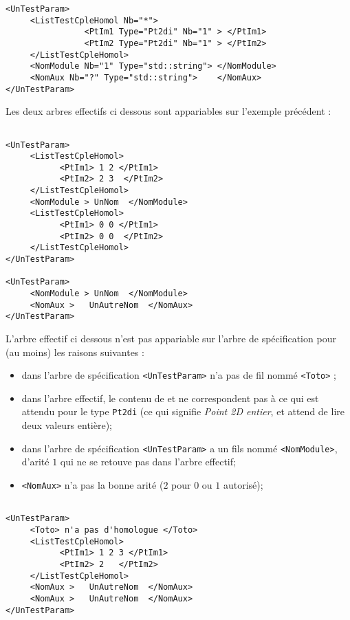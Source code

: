 \begin{verbatim}
<UnTestParam>
     <ListTestCpleHomol Nb="*">
                <PtIm1 Type="Pt2di" Nb="1" > </PtIm1>
                <PtIm2 Type="Pt2di" Nb="1" > </PtIm2>
     </ListTestCpleHomol>
     <NomModule Nb="1" Type="std::string"> </NomModule>
     <NomAux Nb="?" Type="std::string">    </NomAux>
</UnTestParam>
\end{verbatim}



Les deux arbres effectifs ci dessous sont appariables sur l'exemple
pr\'ec\'edent :

\begin{verbatim}

<UnTestParam>
     <ListTestCpleHomol>
           <PtIm1> 1 2 </PtIm1>
           <PtIm2> 2 3  </PtIm2>
     </ListTestCpleHomol>
     <NomModule > UnNom  </NomModule>
     <ListTestCpleHomol>
           <PtIm1> 0 0 </PtIm1>
           <PtIm2> 0 0  </PtIm2>
     </ListTestCpleHomol>
</UnTestParam>

<UnTestParam>
     <NomModule > UnNom  </NomModule>
     <NomAux >   UnAutreNom  </NomAux>
</UnTestParam>

\end{verbatim}

 

L'arbre effectif ci dessous n'est pas  appariable
sur l'arbre de sp\'ecification pour (au moins) les
raisons suivantes :

\begin{itemize}
   \item dans l'arbre de sp\'ecification {\tt <UnTestParam>} 
         n'a pas de fil nomm\'e {\tt  <Toto>} ;
   \item dans l'arbre effectif, le contenu de {\tt <PtIm1>} et
         {\tt <PtIm2>}  ne correspondent pas \`a ce qui est attendu pour
         le type {\tt Pt2di} (ce qui signifie \emph{Point 2D entier},
         et attend de lire deux valeurs enti\`ere);
    \item dans l'arbre de sp\'ecification {\tt <UnTestParam>}
          a un fils nomm\'e  {\tt  <NomModule>}, d'arit\'e $1$ qui
          ne se retouve pas dans l'arbre effectif;
    \item  {\tt <NomAux>} n'a pas la bonne arit\'e ($2$ pour 
           $0$ ou $1$ autoris\'e);
\end{itemize}

\begin{verbatim}

<UnTestParam>
     <Toto> n'a pas d'homologue </Toto>
     <ListTestCpleHomol>
           <PtIm1> 1 2 3 </PtIm1>
           <PtIm2> 2   </PtIm2>
     </ListTestCpleHomol>
     <NomAux >   UnAutreNom  </NomAux>
     <NomAux >   UnAutreNom  </NomAux>
</UnTestParam>

\end{verbatim}

